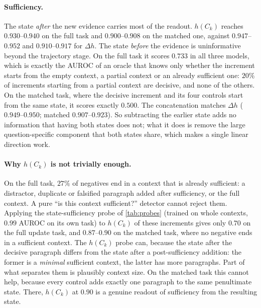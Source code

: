 \paragraph{Sufficiency.} The state \emph{after} the new evidence carries most of the readout. $h(C_k)$ reaches $0.930$--$0.940$ on the full task and $0.900$--$0.908$ on the matched one, against $0.947$--$0.952$ and $0.910$--$0.917$ for $\Delta h$. The state \emph{before} the evidence is uninformative beyond the trajectory stage. On the full task it scores $0.733$ in all three models, which is exactly the AUROC of an oracle that knows only whether the increment starts from the empty context, a partial context or an already sufficient one: $20\%$ of increments starting from a partial context are decisive, and none of the others. On the matched task, where the decisive increment and its four controls start from the same state, it scores exactly $0.500$. The concatenation matches $\Delta h$ ($0.949$--$0.950$; matched $0.907$--$0.923$). So subtracting the earlier state adds no information that having both states does not; what it does is remove the large question-specific component that both states share, which makes a single linear direction work.

\paragraph{Why $h(C_k)$ is not trivially enough.} On the full task, $27\%$ of negatives end in a context that is already sufficient: a distractor, duplicate or falsified paragraph added after sufficiency, or the full context. A pure ``is this context sufficient?'' detector cannot reject them. Applying the state-sufficiency probe of \cref{tab:probes} (trained on whole contexts, $0.99$ AUROC on its own task) to $h(C_k)$ of these increments gives only $0.70$ on the full update task, and $0.87$--$0.90$ on the matched task, where no negative ends in a sufficient context. The $h(C_k)$ probe can, because the state after the decisive paragraph differs from the state after a post-sufficiency addition: the former is a \emph{minimal} sufficient context, the latter has more paragraphs. Part of what separates them is plausibly context size. On the matched task this cannot help, because every control adds exactly one paragraph to the same penultimate state. There, $h(C_k)$ at $0.90$ is a genuine readout of sufficiency from the resulting state.

